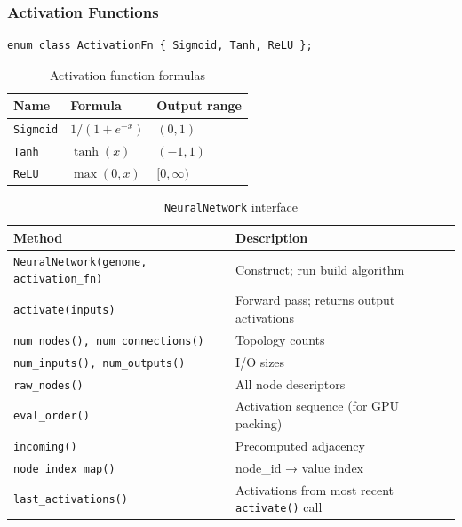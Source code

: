 \subsubsection{Activation Functions}

\begin{lstlisting}
enum class ActivationFn { Sigmoid, Tanh, ReLU };
\end{lstlisting}

\begin{table}[H]
\centering\small
\caption{Activation function formulas}
\begin{tabular}{@{}lll@{}}
\toprule
\textbf{Name} & \textbf{Formula} & \textbf{Output range} \\
\midrule
\texttt{Sigmoid} & $1/(1+e^{-x})$ & $(0,1)$ \\
\texttt{Tanh}    & $\tanh(x)$     & $(-1,1)$ \\
\texttt{ReLU}    & $\max(0,x)$    & $[0,\infty)$ \\
\bottomrule
\end{tabular}
\end{table}

\begin{table}[H]
\centering\small
\caption{\texttt{NeuralNetwork} interface}
\begin{tabularx}{\textwidth}{@{}lX@{}}
\toprule
\textbf{Method} & \textbf{Description} \\
\midrule
\texttt{NeuralNetwork(genome, activation\_fn)} & Construct; run build algorithm \\
\texttt{activate(inputs)} & Forward pass; returns output activations \\
\texttt{num\_nodes(), num\_connections()} & Topology counts \\
\texttt{num\_inputs(), num\_outputs()} & I/O sizes \\
\texttt{raw\_nodes()} & All node descriptors \\
\texttt{eval\_order()} & Activation sequence (for GPU packing) \\
\texttt{incoming()} & Precomputed adjacency \\
\texttt{node\_index\_map()} & node\_id → value index \\
\texttt{last\_activations()} & Activations from most recent \texttt{activate()} call \\
\bottomrule
\end{tabularx}
\end{table}

